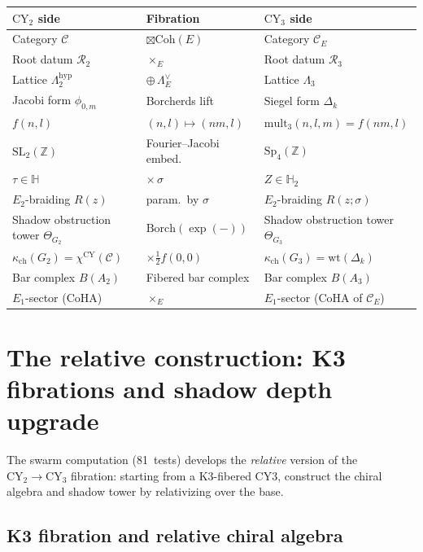 \documentclass[11pt]{article}
\theoremstyle{plain}
\theoremstyle{definition}
\theoremstyle{remark}
\newcommand{\CY}{\mathrm{CY}}
\newcommand{\Coh}{\mathrm{Coh}}
\newcommand{\Eone}{E_1}
\newcommand{\Etwo}{E_2}
\newcommand{\cC}{\mathcal{C}}
\newcommand{\cR}{\mathcal{R}}
\begin{document}
\begin{center}
\renewcommand{\arraystretch}{1.3}
\begin{tabular}{lll}
\textbf{$\CY_2$ side} & \textbf{Fibration} & \textbf{$\CY_3$ side} \\
\hline
Category $\cC$ & $\boxtimes \Coh(E)$ & Category $\cC_E$ \\
Root datum $\cR_2$ & $\times_E$ & Root datum $\cR_3$ \\
Lattice $\Lambda_2^{\mathrm{hyp}}$ & $\oplus \, \Lambda_E^\vee$ & Lattice $\Lambda_3$ \\
Jacobi form $\phi_{0,m}$ & Borcherds lift & Siegel form $\Delta_k$ \\
$f(n, l)$ & $(n,l) \mapsto (nm, l)$ & $\mathrm{mult}_3(n,l,m) = f(nm, l)$ \\
$\mathrm{SL}_2(\mathbb{Z})$ & Fourier--Jacobi embed.\ & $\mathrm{Sp}_4(\mathbb{Z})$ \\
$\tau \in \mathbb{H}$ & $\times \, \sigma$ & $Z \in \mathbb{H}_2$ \\
$\Etwo$-braiding $R(z)$ & param.\ by $\sigma$ & $\Etwo$-braiding $R(z; \sigma)$ \\
Shadow obstruction tower $\Theta_{G_2}$ & $\mathrm{Borch}(\exp(-))$ & Shadow obstruction tower $\Theta_{G_3}$ \\
$\kappa_{\mathrm{ch}}(G_2) = \chi^{\CY}(\cC)$ & $\times \frac{1}{2} f(0,0)$ & $\kappa_{\mathrm{ch}}(G_3) = \mathrm{wt}(\Delta_k)$ \\
Bar complex $B(A_2)$ & Fibered bar complex & Bar complex $B(A_3)$ \\
$\Eone$-sector (CoHA) & $\times_E$ & $\Eone$-sector (CoHA of $\cC_E$) \\
\end{tabular}
\end{center}

\section{The relative construction: K3 fibrations and shadow depth upgrade}
\label{sec:relative-construction}

The swarm computation (81~tests) develops the \emph{relative}
version of the $\CY_2 \to \CY_3$ fibration: starting from
a K3-fibered CY3, construct the chiral algebra and shadow
tower by relativizing over the base.

\subsection{K3 fibration and relative chiral algebra}
\end{document}

